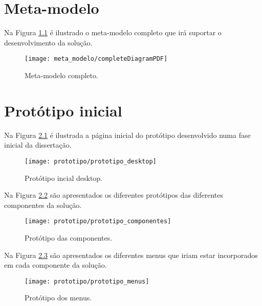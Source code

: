 
%

\chapter{Meta-modelo}
\label{app:meta_modelo_app}

Na Figura \ref{fig:meta_modelo_img} é ilustrado o meta-modelo completo que irá suportar o desenvolvimento da solução.

\begin{figure}[htbp]
  \texttt{[image: meta\_modelo/completeDiagramPDF]}
  \centering
  \caption{Meta-modelo completo.}
  \label{fig:meta_modelo_img}
\end{figure}

\chapter{Protótipo inicial}
\label{app:prototipo_inicial}

Na Figura \ref{fig:prototipo_desktop} é ilustrada a página inicial do protótipo desenvolvido numa fase inicial da dissertação.

\begin{figure}[htbp]
  \texttt{[image: prototipo/prototipo\_desktop]}
  \centering
  \caption{Protótipo incial desktop.}
  \label{fig:prototipo_desktop}
\end{figure}

Na Figura \ref{fig:prototipo_componentes} são apresentados os diferentes protótipos das diferentes componentes da solução.

\begin{figure}[htbp]
  \texttt{[image: prototipo/prototipo\_componentes]}
  \centering
  \caption{Protótipo das componentes.}
  \label{fig:prototipo_componentes}
\end{figure}

Na Figura \ref{fig:prototipo_menus} são apresentados os diferentes menus que iriam estar incorporados em cada componente da solução.

\begin{figure}[htbp]
  \texttt{[image: prototipo/prototipo\_menus]}
  \centering
  \caption{Protótipo dos menus.}
  \label{fig:prototipo_menus}
\end{figure}